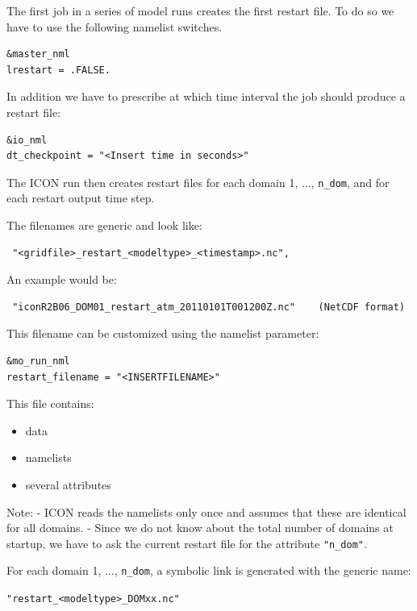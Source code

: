 The first job in a series of model runs creates the first restart file.
To do so we have to use the following namelist switches.

\begin{verbatim}
&master_nml
lrestart = .FALSE. 
\end{verbatim}

In addition we have to prescribe at which time interval the job should produce a restart file:

\begin{verbatim}
&io_nml
dt_checkpoint = "<Insert time in seconds>" 
\end{verbatim}


The ICON run then creates restart files for each domain 1, ..., \verb+n_dom+, and for each restart
output time step. 

The filenames are generic and look like:

\begin{verbatim}
 "<gridfile>_restart_<modeltype>_<timestamp>.nc", 
\end{verbatim}

An example would be:

\begin{verbatim}
 "iconR2B06_DOM01_restart_atm_20110101T001200Z.nc"    (NetCDF format)
\end{verbatim}
   
This filename can be customized using the namelist parameter:
    
     
\begin{verbatim}
&mo_run_nml
restart_filename = "<INSERTFILENAME>" 
\end{verbatim}

This file contains:

\begin{itemize}
\item{data} 
\item{namelists}
\item{several attributes}
\end{itemize}


Note:
    -  ICON reads the namelists only once and assumes that these
       are identical for all domains.
    -  Since we do not know about the total number of domains at startup,
       we have to ask the current restart file for the attribute \verb+"n_dom"+.


For each domain 1, ..., \verb+n_dom+, a symbolic link is generated with the generic name: 

 \verb+"restart_<modeltype>_DOMxx.nc"+

